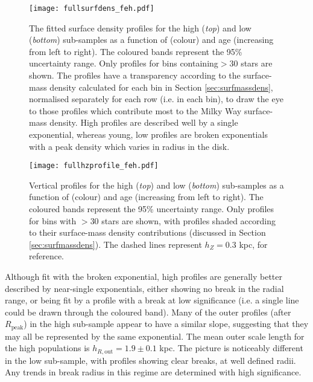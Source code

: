 \begin{landscape}
\begin{figure}
     \texttt{[image: fullsurfdens\_feh.pdf]}
     \centering
    \caption{The fitted surface density profiles for the high \afe{} (\emph{top}) and low \afe{} (\emph{bottom}) sub-samples as a function of \feh{} (colour) and age (increasing from left to right). The coloured bands represent the 95\% uncertainty range.  Only profiles for bins containing$ > 30$ stars are shown. The profiles have a transparency according to the surface-mass density calculated for each bin in Section \ref{sec:surfmassdens}, normalised separately for each row (i.e. in each \feh{} bin), to draw the eye to those profiles which contribute most to the Milky Way surface-mass density. High \afe{} profiles are described well by a single exponential, whereas young, low \afe{} profiles are broken exponentials with a peak density which varies in radius in the disk.}
    \label{fig:surfdens}
\end{figure}

\begin{figure}
	\texttt{[image: fullhzprofile\_feh.pdf]}
	\centering
    \caption{Vertical profiles for the high \afe{} (\emph{top}) and low \afe{} (\emph{bottom}) sub-samples as a function of \feh{} (colour) and age (increasing from left to right). The coloured bands represent the 95\% uncertainty range. Only profiles for bins with $> 30$ stars are shown, with profiles shaded according to their surface-mass density contributions (discussed in Section \ref{sec:surfmassdens}).  The dashed lines represent $h_Z = 0.3$ kpc, for reference.}
    \label{fig:hzprofile}
\end{figure}
\end{landscape}
Although fit with the broken exponential, high \afe{} profiles are generally better described by near-single exponentials, either showing no break in the radial range, or being fit by a profile with a break at low significance (i.e. a single line could be drawn through the coloured band). Many of the outer profiles (after $R_{\mathrm{peak}}$) in the high \afe{} sub-sample appear to have a similar slope, suggesting that they may all be represented by the same exponential. The mean outer scale length for the high \afe{} populations is $h_{R,\text{out}} = 1.9\pm 0.1$ kpc. The picture is noticeably different in the low \afe{} sub-sample, with profiles showing clear breaks, at well defined radii. Any trends in break radius in this regime are determined with high significance.
